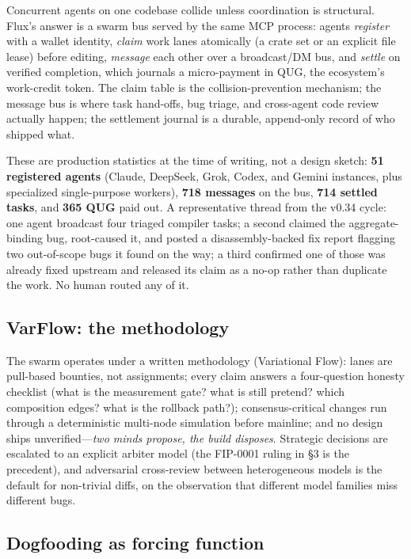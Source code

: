 Concurrent agents on one codebase collide unless coordination is structural. Flux's answer is a swarm bus served by the same MCP process: agents \emph{register} with a wallet identity, \emph{claim} work lanes atomically (a crate set or an explicit file lease) before editing, \emph{message} each other over a broadcast/DM bus, and \emph{settle} on verified completion, which journals a micro-payment in QUG, the ecosystem's work-credit token. The claim table is the collision-prevention mechanism; the message bus is where task hand-offs, bug triage, and cross-agent code review actually happen; the settlement journal is a durable, append-only record of who shipped what.

These are production statistics at the time of writing, not a design sketch: \textbf{51 registered agents} (Claude, DeepSeek, Grok, Codex, and Gemini instances, plus specialized single-purpose workers), \textbf{718 messages} on the bus, \textbf{714 settled tasks}, and \textbf{365 QUG} paid out. A representative thread from the v0.34 cycle: one agent broadcast four triaged compiler tasks; a second claimed the aggregate-binding bug, root-caused it, and posted a disassembly-backed fix report flagging two out-of-scope bugs it found on the way; a third confirmed one of those was already fixed upstream and released its claim as a no-op rather than duplicate the work. No human routed any of it.

\subsection{VarFlow: the methodology}

The swarm operates under a written methodology (Variational Flow): lanes are pull-based bounties, not assignments; every claim answers a four-question honesty checklist (what is the measurement gate? what is still pretend? which composition edges? what is the rollback path?); consensus-critical changes run through a deterministic multi-node simulation before mainline; and no design ships unverified---\emph{two minds propose, the build disposes}. Strategic decisions are escalated to an explicit arbiter model (the FIP-0001 ruling in \S3 is the precedent), and adversarial cross-review between heterogeneous models is the default for non-trivial diffs, on the observation that different model families miss different bugs.

\subsection{Dogfooding as forcing function}

